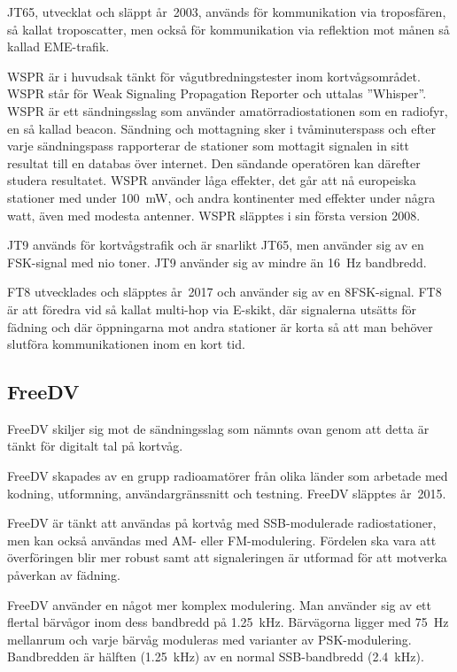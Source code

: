 JT65, utvecklat och släppt år~2003, används för kommunikation via troposfären,
så kallat troposcatter, men också för kommunikation via reflektion mot månen
så kallad EME-trafik.

WSPR är i huvudsak tänkt för vågutbredningstester inom kortvågsområdet.
WSPR står för Weak Signaling Propagation Reporter och uttalas ''Whisper''.
WSPR är ett sändningsslag som använder amatörradiostationen som en radiofyr, en
så kallad beacon.
Sändning och mottagning sker i tvåminuterspass och efter varje sändningspass
rapporterar de stationer som mottagit signalen in sitt resultat till en databas
över internet.
Den sändande operatören kan därefter studera resultatet.
WSPR använder låga effekter, det går att nå europeiska stationer med under
\qty{100}{\milli\watt}, och andra kontinenter med effekter under några watt,
även med modesta antenner.
WSPR släpptes i sin första version 2008.

JT9 används för kortvågstrafik och är snarlikt JT65, men använder sig av en
FSK-signal med nio toner.
JT9 använder sig av mindre än \qty{16}{\hertz} bandbredd.

FT8 utvecklades och släpptes år~2017 och använder sig av en 8FSK-signal.
FT8 är att föredra vid så kallat multi-hop via E-skikt, där signalerna utsätts
för fädning och där öppningarna mot andra stationer är korta så att man behöver
slutföra kommunikationen inom en kort tid.

\subsection{FreeDV}

FreeDV skiljer sig mot de sändningsslag som nämnts ovan genom att detta är tänkt
för digitalt tal på kortvåg.

FreeDV skapades av en grupp radioamatörer från olika länder som arbetade
med kodning, utformning, användargränssnitt och testning.
FreeDV släpptes år~2015.

FreeDV är tänkt att användas på kortvåg med SSB-modulerade radiostationer,
men kan också användas med AM- eller FM-modulering.
Fördelen ska vara att överföringen blir mer robust samt att signaleringen är
utformad för att motverka påverkan av fädning.

FreeDV använder en något mer komplex modulering.
Man använder sig av ett flertal bärvågor inom dess bandbredd på
\qty{1,25}{\kilo\hertz}.
Bärvägorna ligger med \qty{75}{\hertz} mellanrum och varje bärvåg moduleras med
varianter av PSK-modulering.
Bandbredden är hälften (\qty{1,25}{\kilo\hertz}) av en normal SSB-bandbredd
(\qty{2,4}{\kilo\hertz}).
